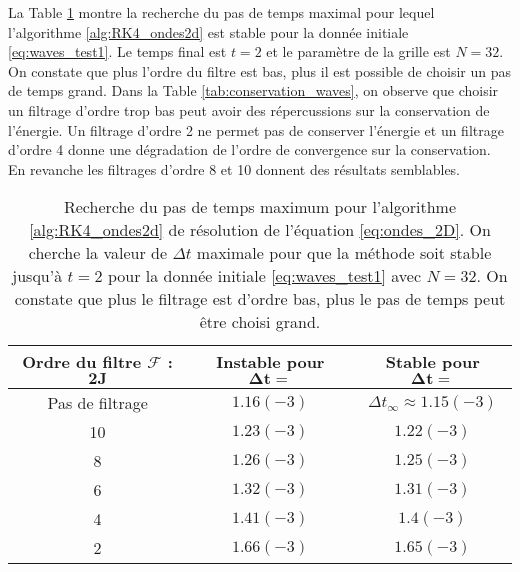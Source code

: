 La Table \ref{tab:dt_critique_waves} montre la recherche du pas de temps maximal pour lequel l'algorithme \ref{alg:RK4_ondes2d} est stable pour la donnée initiale \eqref{eq:waves_test1}. Le temps final est $t=2$ et le paramètre de la grille est $N=32$. On constate que plus l'ordre du filtre est bas, plus il est possible de choisir un pas de temps grand. Dans la Table \ref{tab:conservation_waves}, on observe que choisir un filtrage d'ordre trop bas peut avoir des répercussions sur la conservation de l'énergie. Un filtrage d'ordre 2 ne permet pas de conserver l'énergie et un filtrage d'ordre 4 donne une dégradation de l'ordre de convergence sur la conservation. En revanche les filtrages d'ordre 8 et 10 donnent des résultats semblables.

\begin{table}[htbp]
\begin{center}
\begin{tabular}{|c||c|c|}
\hline
\textbf{Ordre du filtre } $\mathbf{\mathcal{F}}$ : $\mathbf{2J}$  & \textbf{Instable pour} $\mathbf{\Delta t =}$ & \textbf{Stable pour} $\mathbf{\Delta t =}$ \\
\hline
\hline
Pas de filtrage & $1.16(-3)$ & $\Delta t _{\infty} \approx 1.15(-3)$\\
10 & $1.23(-3)$ & $1.22(-3)$ \\
8 & $1.26(-3)$ & $1.25(-3)$ \\
6 & $1.32(-3)$ & $1.31(-3)$ \\
4 & $1.41(-3)$ & $1.4(-3)$ \\
2 & $1.66(-3)$ & $1.65(-3)$ \\
\hline
\end{tabular}
\end{center}
\caption{Recherche du pas de temps maximum pour l'algorithme \ref{alg:RK4_ondes2d} de résolution de l'équation \eqref{eq:ondes_2D}. On cherche la valeur de $\Delta t$ maximale pour que la méthode soit stable jusqu'à $t=2$ pour la donnée initiale \eqref{eq:waves_test1} avec $N=32$. On constate que plus le filtrage est d'ordre bas, plus le pas de temps peut être choisi grand.}
\label{tab:dt_critique_waves}
\end{table} 



